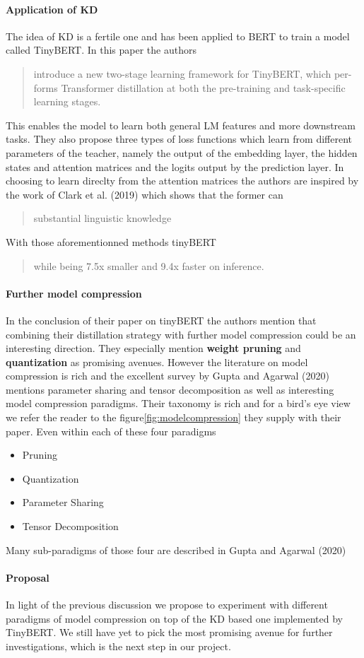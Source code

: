 \message{ !name(projectproposal.tex)}\documentclass{article}
\begin{document}
\paragraph{Application of KD} The idea of KD is a fertile one and has been
applied to BERT to train a model called TinyBERT\cite{tinybert}. In this paper
the authors \blockcquote{tinybert}{introduce a new two-stage learning framework
for TinyBERT, which per- forms Transformer distillation at both the pre-training
and task-specific learning stages.} This enables the model to learn both general
LM features and more downstream tasks. They also propose three types of loss
functions which learn from different parameters of the teacher, namely the
output of the embedding layer, the hidden states and attention matrices and the
logits output by the prediction layer. In choosing to learn direclty from the
attention matrices the authors are inspired by the work of Clark et al.
(2019)\cite{whatdoesbertlookat} which shows that the former can
\blockcquote{tinybert}{substantial linguistic knowledge}. With those
aforementionned methods tinyBERT \blockcquote{tinybert}{while being
7.5x smaller and 9.4x faster on inference.}


\paragraph{Further model compression} In the conclusion of their paper on
tinyBERT the authors mention that combining their distillation strategy with
further model compression could be an interesting direction. They especially
mention \textbf{weight pruning} and \textbf{quantization} as promising avenues.
However the literature on model compression is rich and the excellent survey by
Gupta and Agarwal (2020) \cite{gupta2020compression} mentions parameter sharing
and tensor decomposition as well as interesting model compression paradigms.
Their taxonomy is rich and for a bird's eye view we refer the reader to the
figure\ref{fig:modelcompression} they supply with their paper. Even within
each of these four paradigms
\begin{itemize}
  \item Pruning
  \item Quantization
  \item Parameter Sharing
  \item Tensor Decomposition
\end{itemize}
Many sub-paradigms of those four are described in Gupta and Agarwal (2020)

\paragraph{Proposal} In light of the previous discussion we propose to
experiment with different paradigms of model compression on top of the KD based
one implemented by TinyBERT. We still have yet to pick the most promising avenue
for further investigations, which is the next step in our project.
\end{document}

